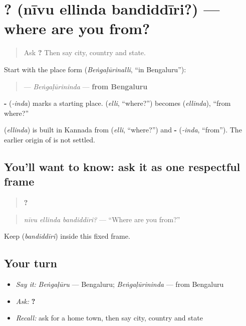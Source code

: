 \section[\texorpdfstring{\kn{ನೀವು} \kn{ಎಲ್ಲಿಂದ} … (nīvu ellinda …)}{ನೀವು ಎಲ್ಲಿಂದ … (nīvu ellinda …)}]{  ? (nīvu ellinda bandiddīri?) — where are you from?}

\label{lesson:KA-C103-origin}



\begin{quote}
Ask \textbf{  ?} Then say city, country and state.
\end{quote}

\begin{grammarlens}[title={Grammar Lens: -\kn{ಇಂದ} means “from”}]
Start with the place form \textbf{} (\emph{Beṅgaḷūrinalli}, “in Bengaluru”):

\begin{quote}
\textbf{} — \emph{Beṅgaḷūrininda} — \textbf{from Bengaluru}
\end{quote}

\textbf{-} (\emph{-inda}) marks a starting place. \textbf{} (\emph{elli}, “where?”) becomes \textbf{} (\emph{ellinda}), “from where?”
\end{grammarlens}

\begin{cousinweb}
\textbf{} (\emph{ellinda}) is built in Kannada from \textbf{} (\emph{elli}, “where?”) and \textbf{-} (\emph{-inda}, “from”). The earlier origin of \textbf{} is not settled.
\end{cousinweb}

\subsection*{You'll want to know: ask it as one respectful frame}
\begin{quote}
\textbf{  ?}
\end{quote}

\begin{quote}
\emph{nīvu ellinda bandiddīri?} — “Where are you from?”
\end{quote}

Keep \textbf{} (\emph{bandiddīri}) inside this fixed frame.

\subsection*{Your turn}
\begin{itemize}
\raggedright
  \item \emph{Say it:} \emph{Beṅgaḷūru} — Bengaluru; \emph{Beṅgaḷūrininda} — from Bengaluru
  \item \emph{Ask:} \textbf{  ?}
  \item \emph{Recall:} ask for a home town, then say city, country and state
\end{itemize}

